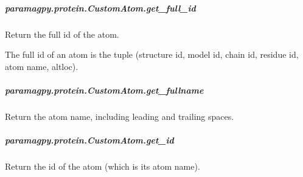 \documentclass[a4paper,10pt,english]{sphinxmanual}
\begin{document}
\begin{fulllineitems}
\begin{fulllineitems}
\begin{fulllineitems}
\end{fulllineitems}



\subparagraph{paramagpy.protein.CustomAtom.get\_full\_id}
\label{\detokenize{reference/generated/paramagpy.protein.CustomAtom.get_full_id:paramagpy-protein-customatom-get-full-id}}\label{\detokenize{reference/generated/paramagpy.protein.CustomAtom.get_full_id::doc}}

\begin{fulllineitems}
\label{\detokenize{reference/generated/paramagpy.protein.CustomAtom.get_full_id:paramagpy.protein.CustomAtom.get_full_id}}
Return the full id of the atom.

The full id of an atom is the tuple
(structure id, model id, chain id, residue id, atom name, altloc).

\end{fulllineitems}



\subparagraph{paramagpy.protein.CustomAtom.get\_fullname}
\label{\detokenize{reference/generated/paramagpy.protein.CustomAtom.get_fullname:paramagpy-protein-customatom-get-fullname}}\label{\detokenize{reference/generated/paramagpy.protein.CustomAtom.get_fullname::doc}}

\begin{fulllineitems}
\label{\detokenize{reference/generated/paramagpy.protein.CustomAtom.get_fullname:paramagpy.protein.CustomAtom.get_fullname}}
Return the atom name, including leading and trailing spaces.

\end{fulllineitems}



\subparagraph{paramagpy.protein.CustomAtom.get\_id}
\label{\detokenize{reference/generated/paramagpy.protein.CustomAtom.get_id:paramagpy-protein-customatom-get-id}}\label{\detokenize{reference/generated/paramagpy.protein.CustomAtom.get_id::doc}}

\begin{fulllineitems}
\label{\detokenize{reference/generated/paramagpy.protein.CustomAtom.get_id:paramagpy.protein.CustomAtom.get_id}}
Return the id of the atom (which is its atom name).


\end{fulllineitems}
\end{fulllineitems}
\end{fulllineitems}
\end{document}
